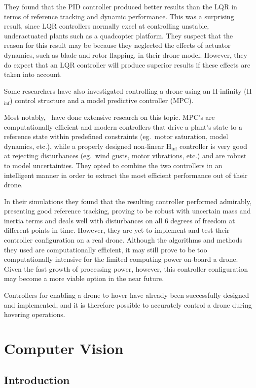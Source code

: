 They found that the PID controller produced better results than the LQR in terms of reference tracking and dynamic performance. This was a surprising result, since LQR controllers normally excel at controlling unstable, underactuated plants such as a quadcopter platform. They suspect that the reason for this result may be because they neglected the effects of actuator dynamics, such as blade and rotor flapping, in their drone model. However, they do expect that an LQR controller will produce superior results if these effects are taken into account. 

Some researchers have also investigated controlling a drone using an H-infinity (H$_{\inf}$) control structure and a model predictive controller (MPC).

Most notably,~\cite{raffo2010integral} have done extensive research on this topic. MPC's are computationally efficient and modern controllers that drive a plant's state to a reference state within predefined constraints (eg.\ motor saturation, model dynamics, etc.), while a properly designed non-linear H$_{\inf}$ controller is very good at rejecting disturbances (eg.\ wind gusts, motor vibrations, etc.) and are robust to model uncertainties. They opted to combine the two controllers in an intelligent manner in order to extract the most efficient performance out of their drone. 

In their simulations they found that the resulting controller performed admirably, presenting good reference tracking, proving to be robust with uncertain mass and inertia terms and deals well with disturbances on all 6 degrees of freedom at different points in time. However, they are yet to implement and test their controller configuration on a real drone. Although the algorithms and methods they used are computationally efficient, it may still prove to be too computationally intensive for the limited computing power on-board a drone. Given the fast growth of processing power, however, this controller configuration may become a more viable option in the near future. 

Controllers for enabling a drone to hover have already been successfully designed and implemented, and it is therefore possible to accurately control a drone during hovering operations. 

\section{Computer Vision}

\subsection{Introduction}

